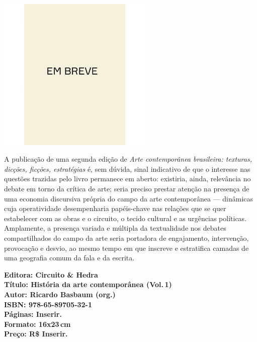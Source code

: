 \pagestyle{circuito}
\label{circuito}

\begin{center}
\hspace*{.5cm}\includegraphics[width=74mm]{./CAPAS/breve.jpeg}
\end{center}
\hspace*{-7cm}\hrulefill\hspace*{-7cm}
\medskip

\noindent{}A publicação de uma segunda edição de \textit{Arte contemporânea brasileira: texturas, dicções, ficções, estratégias} é, sem dúvida, sinal indicativo de que o interesse nas questões trazidas pelo livro permanece em aberto: existiria, ainda, relevância no debate em torno da crítica de arte; seria preciso prestar atenção na presença de uma economia discursiva própria do campo da arte contemporânea --- dinâmicas cuja operatividade desempenharia papéis-chave nas relações que se quer estabelecer com as obras e o circuito, o tecido cultural e as urgências políticas. Amplamente, a presença variada e múltipla da textualidade nos debates compartilhados do campo da arte seria portadora de engajamento, intervenção, provocação e desvio, ao mesmo tempo em que inscreve e estratifica camadas de uma geografia comum da fala e da escrita.

\vfill
\noindent\begin{minipage}[c]{1\linewidth}
{\small\textbf{
\hspace*{-.1cm}Editora: Circuito \& Hedra\\
Título: História da arte contemporânea (Vol.\,1)\\
Autor: Ricardo Basbaum (org.)\\ 
ISBN: 978-65-89705-32-1\\
Páginas: Inserir.\\
Formato: 16x23\,cm\\
Preço: R\$ Inserir.\\
}}
\end{minipage}
\pagebreak

